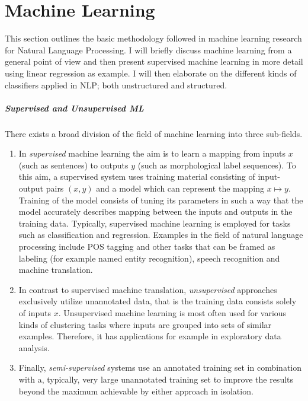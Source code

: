 \chapter{Machine Learning}
\label{chap:ml}

This section outlines the basic methodology followed in machine
learning research for Natural Language Processing. I will briefly
discuss machine learning from a general point of view and then present
supervised machine learning in more detail using linear regression as
example. I will then elaborate on the different kinds of classifiers
applied in NLP; both unstructured and structured.

\paragraph{Supervised and Unsupervised ML} There exists a broad
division of the field of machine learning into three sub-fields.
\begin{enumerate}
\item In {\it supervised} machine learning the aim is to learn a mapping
  from inputs $x$ (such as sentences) to outputs $y$ (such as
  morphological label sequences). To this aim, a supervised system
  uses training material consisting of input-output pairs $(x,y)$ and
  a model which can represent the mapping $x \mapsto y$. Training of
  the model consists of tuning its parameters in such a way that the
  model accurately describes mapping between the inputs and outputs in
  the training data. Typically, supervised machine learning is
  employed for tasks such as classification and regression. Examples
  in the field of natural language processing include POS tagging and
  other tasks that can be framed as labeling (for example named entity
  recognition), speech recognition and machine translation.
\item In contrast to supervised machine translation, {\it unsupervised}
  approaches exclusively utilize unannotated data, that is the
  training data consists solely of inputs $x$. Unsupervised machine
  learning is most often used for various kinds of clustering tasks
  where inputs are grouped into sets of similar examples. Therefore,
  it has applications for example in exploratory data analysis.
\item Finally, {\it semi-supervised}
  systems use an annotated training set in combination with a,
  typically, very large unannotated training set to improve the
  results beyond the maximum achievable by either approach in
  isolation.
\end{enumerate}

